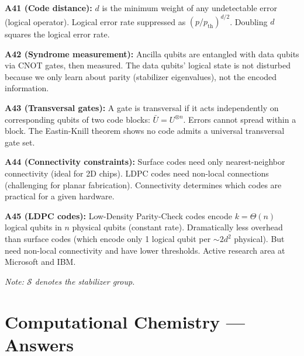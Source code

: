 \documentclass[11pt,a4paper]{article}
\begin{document}
\begin{answerbox}
\textbf{A41 (Code distance):} $d$ is the minimum weight of any undetectable error (logical operator). Logical error rate suppressed as $(p/p_{\text{th}})^{d/2}$. Doubling $d$ squares the logical error rate.

\textbf{A42 (Syndrome measurement):} Ancilla qubits are entangled with data qubits via CNOT gates, then measured. The data qubits' logical state is not disturbed because we only learn about parity (stabilizer eigenvalues), not the encoded information.

\textbf{A43 (Transversal gates):} A gate is transversal if it acts independently on corresponding qubits of two code blocks: $\bar{U} = U^{\otimes n}$. Errors cannot spread within a block. The Eastin-Knill theorem shows no code admits a universal transversal gate set.

\textbf{A44 (Connectivity constraints):} Surface codes need only nearest-neighbor connectivity (ideal for 2D chips). LDPC codes need non-local connections (challenging for planar fabrication). Connectivity determines which codes are practical for a given hardware.

\textbf{A45 (LDPC codes):} Low-Density Parity-Check codes encode $k = \Theta(n)$ logical qubits in $n$ physical qubits (constant rate). Dramatically less overhead than surface codes (which encode only 1 logical qubit per $\sim 2d^2$ physical). But need non-local connectivity and have lower thresholds. Active research area at Microsoft and IBM.

\textit{Note: $\mathcal{S}$ denotes the stabilizer group.}
\end{answerbox}


\section{Computational Chemistry --- Answers}
\end{document}
